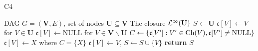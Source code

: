 \renewcommand{\graphscale}{0.8}

\begin{algorithm}[htb]
   \caption{C4}
   \label{alg:c4}
\begin{algorithmic}[1]
    DAG $G=(\mathbf{V},E)$, set of nodes $\mathbf{U} \subseteq \mathbf{V}$
    The closure $\mathcal{L}^{\infty} (\mathbf{U})$
   \STATE $S \leftarrow \mathbf{U}$
   \STATE $\mathfrak{c}[V] \leftarrow V$ for $V \in \mathbf{U}$
   \STATE $\mathfrak{c}[V] \leftarrow \mathrm{NULL}$ for $V \in \mathbf{V} \backslash \mathbf{U}$
   \STATE $C \leftarrow \{\mathfrak{c}[V']: V' \in \mathrm{Ch}(V), \mathfrak{c}[V'] \neq \mathrm{NULL}\}$
   \STATE $\mathfrak{c}[V] \leftarrow X$ where $C=\{X\}$
   \STATE $\mathfrak{c}[V] \leftarrow V$, $S \leftarrow S \cup \{V\}$
   \ENDIF
   \ENDFOR
   \STATE \textbf{return} $S$
\end{algorithmic}
\end{algorithm}

